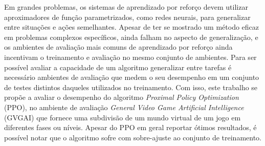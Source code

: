 \begin{resumo} 
Em grandes problemas, os sistemas de aprendizado por reforço devem utilizar aproximadores de função parametrizados, como redes neurais, para generalizar entre situações e ações semelhantes. Apesar de ter se mostrado um método eficaz em problemas complexos específicos, ainda falham no aspecto de generalização, e os ambientes de avaliação mais comuns de aprendizado por reforço ainda incentivam o treinamento e avaliação no mesmo conjunto de ambientes. Para ser possível avaliar a capacidade de um algoritmo generalizar entre tarefas é necessário ambientes de avaliação que medem o seu desempenho em um conjunto de testes distintos daqueles utilizados no treinamento. Com isso, este trabalho se propõe a avaliar o desempenho do algoritmo \textit{Proximal Policy Optimization} (PPO), no ambiente de avaliação \textit{General Video Game Artificial Intelligence} (GVGAI) que fornece uma subdivisão de um mundo virtual de um jogo em diferentes fases ou níveis. Apesar do PPO em geral reportar ótimos resultados, é possível notar que o algoritmo sofre com sobre-ajuste ao conjunto de treinamento.
\end{resumo}

